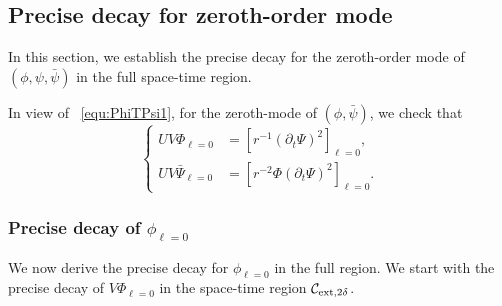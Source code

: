 \documentclass[a4paper,reqno]{amsart}
\theoremstyle{definition}
\numberwithin{equation}{section}
\def \pt{\partial_{t}}
\begin{document}
 \subsection{Precise decay for zeroth-order mode}\label{SS:0order}

In this section, we establish the precise decay for the zeroth-order mode of $(\phi,\psi,\bar{\psi})$ in the full space-time region. 

\smallskip
In view of ~\eqref{equ:PhiTPsi1}, for the zeroth-mode of $(\phi, \bar{\psi})$, 
we check that 
\begin{equation}\label{equ:PhiTPsi}
\left\{
\begin{aligned}
    UV\Phi_{\ell=0}&=\left[r^{-1}\left(\pt \Psi\right)^{2}\right]_{\ell=0},\\
    UV\bar{\Psi}_{\ell=0}&=\left[r^{-2}\Phi\left(\pt \Psi\right)^{2}\right]_{\ell=0}.  \end{aligned}
\right.
\end{equation} 

\subsubsection{Precise decay of $\phi_{\ell=0}$}
We now derive the precise decay for $\phi_{\ell=0}$ in the full region. We start with the precise decay of $V\Phi_{\ell=0}$ in the space-time region $\mathcal{C}_{{\rm{ext}},2\delta}$.
\end{document}
